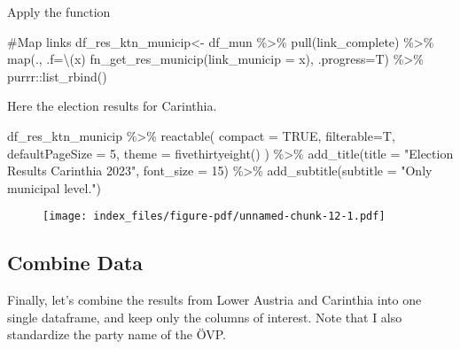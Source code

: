 \documentclass[
  letterpaper,
  DIV=11,
  numbers=noendperiod,
  oneside]{scrartcl}
\newenvironment{Shaded}{\begin{snugshade}}{\end{snugshade}}
\newcommand{\AttributeTok}[1]{\textcolor[rgb]{0.40,0.45,0.13}{#1}}
\newcommand{\CommentTok}[1]{\textcolor[rgb]{0.37,0.37,0.37}{#1}}
\newcommand{\ConstantTok}[1]{\textcolor[rgb]{0.56,0.35,0.01}{#1}}
\newcommand{\DecValTok}[1]{\textcolor[rgb]{0.68,0.00,0.00}{#1}}
\newcommand{\FunctionTok}[1]{\textcolor[rgb]{0.28,0.35,0.67}{#1}}
\newcommand{\NormalTok}[1]{\textcolor[rgb]{0.00,0.23,0.31}{#1}}
\newcommand{\OtherTok}[1]{\textcolor[rgb]{0.00,0.23,0.31}{#1}}
\newcommand{\SpecialCharTok}[1]{\textcolor[rgb]{0.37,0.37,0.37}{#1}}
\newcommand{\StringTok}[1]{\textcolor[rgb]{0.13,0.47,0.30}{#1}}
\begin{document}
Apply the function

\begin{Shaded}
\begin{Highlighting}[]
\CommentTok{\#Map links}
\NormalTok{df\_res\_ktn\_municip}\OtherTok{\textless{}{-}}\NormalTok{ df\_mun }\SpecialCharTok{\%\textgreater{}\%} 
  \FunctionTok{pull}\NormalTok{(link\_complete) }\SpecialCharTok{\%\textgreater{}\%} 
  \FunctionTok{map}\NormalTok{(., }\AttributeTok{.f=}\NormalTok{\textbackslash{}(x) }\FunctionTok{fn\_get\_res\_municip}\NormalTok{(}\AttributeTok{link\_municip =}\NormalTok{ x), }\AttributeTok{.progress=}\NormalTok{T) }\SpecialCharTok{\%\textgreater{}\%} 
\NormalTok{  purrr}\SpecialCharTok{::}\FunctionTok{list\_rbind}\NormalTok{() }
\end{Highlighting}
\end{Shaded}

Here the election results for Carinthia.

\begin{Shaded}
\begin{Highlighting}[]
\NormalTok{df\_res\_ktn\_municip }\SpecialCharTok{\%\textgreater{}\%} 
    \FunctionTok{reactable}\NormalTok{(}
    \AttributeTok{compact =} \ConstantTok{TRUE}\NormalTok{, }
    \AttributeTok{filterable=}\NormalTok{T,}
    \AttributeTok{defaultPageSize =} \DecValTok{5}\NormalTok{, }
    \AttributeTok{theme =} \FunctionTok{fivethirtyeight}\NormalTok{()}
\NormalTok{  ) }\SpecialCharTok{\%\textgreater{}\%}
  \FunctionTok{add\_title}\NormalTok{(}\AttributeTok{title =} \StringTok{"Election Results Carinthia 2023"}\NormalTok{, }\AttributeTok{font\_size =} \DecValTok{15}\NormalTok{) }\SpecialCharTok{\%\textgreater{}\%} 
  \FunctionTok{add\_subtitle}\NormalTok{(}\AttributeTok{subtitle =} \StringTok{"Only municipal level."}\NormalTok{)}
\end{Highlighting}
\end{Shaded}

\begin{figure}[H]

\texttt{[image: index\_files/figure-pdf/unnamed-chunk-12-1.pdf]} \hfill{}

\end{figure}

\hypertarget{combine-data}{%
\subsection{Combine Data}\label{combine-data}}

Finally, let's combine the results from Lower Austria and Carinthia into
one single dataframe, and keep only the columns of interest. Note that I
also standardize the party name of the ÖVP.
\end{document}
